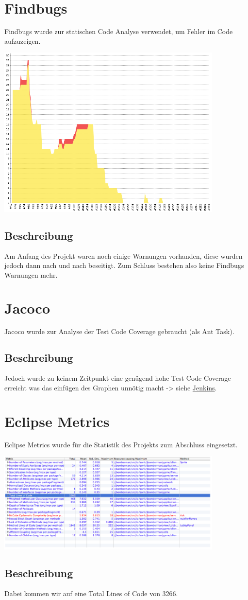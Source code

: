 \documentclass[11pt]{scrartcl}
\begin{document}
\section{Findbugs}
Findbugs wurde zur statischen Code Analyse verwendet, um Fehler im Code 
aufzuzeigen.
\begin{center}
 \includegraphics[width=0.85\textwidth]{findbugs}
\end{center}
\subsection{Beschreibung}
Am Anfang des Projekt waren noch einige Warnungen vorhanden, 
diese wurden jedoch dann nach und nach beseitigt.
Zum Schluss bestehen also keine Findbugs Warnungen mehr.
\newpage
\section{Jacoco}
Jacoco wurde zur Analyse der Test Code Coverage gebraucht (als Ant Task).
\subsection{Beschreibung}
Jedoch wurde zu keinem Zeitpunkt eine genügend hohe Test Code Coverage 
erreicht was das einfügen des Graphen unnötig macht -> siehe 
\href{http://se2p.zonk.io/jenkins/}{Jenkins}.
\newpage
\section{Eclipse Metrics}
Eclipse Metrics wurde für die Statistik des Projekts zum Abschluss eingesetzt.
\begin{center}
 \includegraphics[width=0.85\textwidth]{metrics}
\end{center}
\subsection{Beschreibung}
Dabei kommen wir auf eine Total Lines of Code von 3266.
\end{document}
